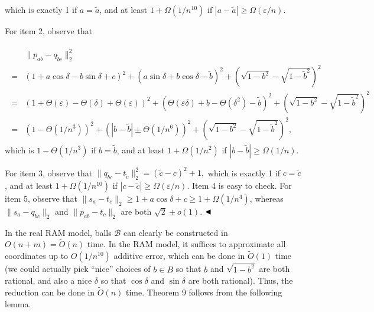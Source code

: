 \documentclass[10pt,a4paper]{article}
\begin{document}
which is exactly 1 if $a=\tilde{a}$, and at least $1+\Omega(1/n^{10})$ if $|a-\tilde{a}|\geq\Omega(\varepsilon/n)$.
\par
\par
For item 2, observe that
\par
\[\begin{aligned}
\begin{split}&\|p_{ab}-q_{\tilde{b}c}\|^{2}_{2}\\
=&(1+a\cos\delta-b\sin\delta+c)^{2}+(a\sin\delta+b\cos\delta-\tilde{b})^{2}+(%
\sqrt{1-b^{2}}-\sqrt{1-\tilde{b}^{2}})^{2}\\
=&(1+\Theta(\varepsilon)-\Theta(\delta)+\Theta(\varepsilon))^{2}+(\Theta(%
\varepsilon\delta)+b-\Theta(\delta^{2})-\tilde{b})^{2}+(\sqrt{1-b^{2}}-\sqrt{1%
-\tilde{b}^{2}})^{2}\\
=&(1-\Theta(1/n^{3}))^{2}+(|b-\tilde{b}|\pm\Theta(1/n^{6}))^{2}+(\sqrt{1-b^{2}%
}-\sqrt{1-\tilde{b}^{2}})^{2},\end{split}
\end{aligned}\]
which is $1-\Theta(1/n^{3})$ if $b=\tilde{b}$, and at least $1+\Omega(1/n^{2})$ if $|b-\tilde{b}|\geq\Omega(1/n)$.
\par
\par
For item 3, observe that $\|q_{bc}-t_{\tilde{c}}\|^{2}_{2}=(\tilde{c}-c)^{2}+1,$ which is exactly 1 if $c=\tilde{c}$, and at least $1+\Omega(1/n^{10})$ if $|c-\tilde{c}|\geq\Omega(\varepsilon/n)$. Item 4 is easy to check. For item 5, observe that $\|s_{a}-t_{c}\|_{2}\geq 1+a\cos\delta+c\geq 1+\Omega(1/n^{4})$, whereas $\|s_{a}-q_{bc}\|_{2}$ and $\|p_{ab}-t_{c}\|_{2}$ are both $\sqrt{2}\pm o(1)$. $\hfill\blacktriangleleft$
\par
\par
In the real RAM model, balls $\mathcal{B}$ can clearly be constructed in $O(n+m)=\tilde{O}(n)$ time. In the RAM model, it suffices to approximate all coordinates up to $O(1/n^{10})$ additive error, which can be done in $\tilde{O}(1)$ time (we could actually pick “nice” choices of $b\in B$ so that $b$ and $\sqrt{1-b^{2}}$ are both rational, and also a nice $\delta$ so that $\cos\delta$ and $\sin\delta$ are both rational). Thus, the reduction can be done in $\tilde{O}(n)$ time. Theorem 9 follows from the following lemma.
\par
\par
\end{document}
